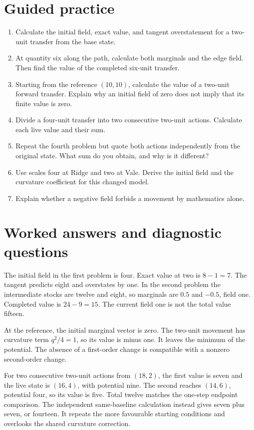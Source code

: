 \section{Guided practice}

\begin{enumerate}
\item Calculate the initial field, exact value, and tangent overstatement for a two-unit transfer from the base state.
\item At quantity six along the path, calculate both marginals and the edge field. Then find the value of the completed six-unit transfer.
\item Starting from the reference \((10,10)\), calculate the value of a two-unit forward transfer. Explain why an initial field of zero does not imply that its finite value is zero.
\item Divide a four-unit transfer into two consecutive two-unit actions. Calculate each live value and their sum.
\item Repeat the fourth problem but quote both actions independently from the original state. What sum do you obtain, and why is it different?
\item Use scales four at Ridge and two at Vale. Derive the initial field and the curvature coefficient for this changed model.
\item Explain whether a negative field forbids a movement by mathematics alone.
\end{enumerate}

\section{Worked answers and diagnostic questions}

The initial field in the first problem is four. Exact value at two is \(8-1=7\). The tangent predicts eight and overstates by one. In the second problem the intermediate stocks are twelve and eight, so marginals are \(0.5\) and \(-0.5\), field one. Completed value is \(24-9=15\). The current field one is not the total value fifteen.

At the reference, the initial marginal vector is zero. The two-unit movement has curvature term \(q^2/4=1\), so its value is minus one. It leaves the minimum of the potential. The absence of a first-order change is compatible with a nonzero second-order change.

For two consecutive two-unit actions from \((18,2)\), the first value is seven and the live state is \((16,4)\), with potential nine. The second reaches \((14,6)\), potential four, so its value is five. Total twelve matches the one-step endpoint comparison. The independent same-baseline calculation instead gives seven plus seven, or fourteen. It repeats the more favourable starting conditions and overlooks the shared curvature correction.

